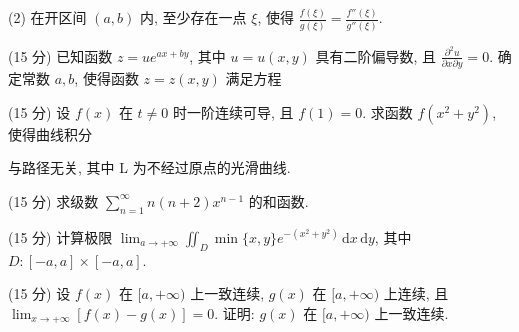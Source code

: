 (2) 在开区间 $(a, b)$ 内, 至少存在一点 $\xi$, 使得 $\frac{f(\xi)}{g(\xi)} = \frac{f''(\xi)}{g''(\xi)}$.\par
\par{}
\par{}
(15 分) 已知函数 $z = ue^{ax + by}$, 其中 $u = u(x, y)$ 具有二阶偏导数, 且 $\frac{\partial^2 u}{\partial x \partial y} = 0$. 确定常数 $a, b$, 使得函数 $z = z(x, y)$ 满足方程\par
\nopagebreak[4]
\par{}
\par{}
(15 分) 设 $f(x)$ 在 $t \neq 0$ 时一阶连续可导, 且 $f(1) = 0$. 求函数 $f(x^2 + y^2)$, 使得曲线积分\par
\nopagebreak[4]
与路径无关, 其中 L 为不经过原点的光滑曲线.\par
\par{}
(15 分) 求级数 $\sum_{n=1}^{\infty} n(n+2)x^{n-1}$ 的和函数.\par
\par{}
(15 分) 计算极限 $\lim_{a \to +\infty} \iint_{D} \min\{x, y\} e^{-(x^2 + y^2)} \, \mathrm{d}x \, \mathrm{d}y$, 其中 $D: [-a, a] \times [-a, a]$.\par
\par{}
(15 分) 设 $f(x)$ 在 $[a, +\infty)$ 上一致连续, $g(x)$ 在 $[a, +\infty)$ 上连续, 且 $\lim_{x \to +\infty} [f(x) - g(x)] = 0$. 证明: $g(x)$ 在 $[a, +\infty)$ 上一致连续.\par
